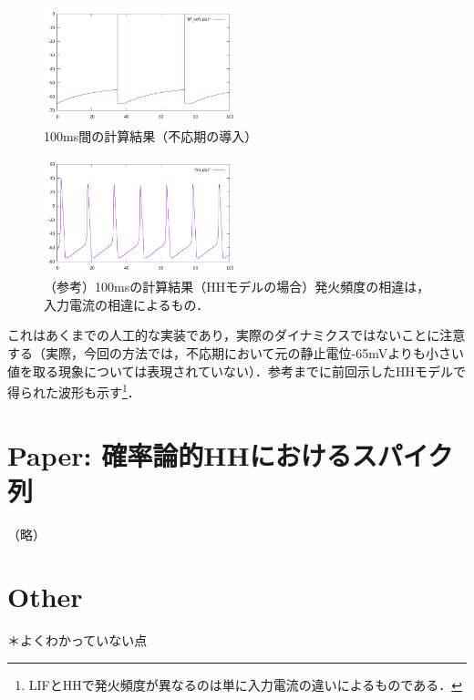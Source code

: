 \documentclass[dvipdfmx, A4j, twocolumn, 10.5pt]{jsarticle}
\begin{document}
\begin{figure}[h]
    \centering
    \includegraphics[width=0.5\textwidth]{images/lif_refr_100ms.pdf}
    \caption{100ms間の計算結果（不応期の導入）}
\end{figure}

\begin{figure}[h]
    \centering
    \includegraphics[width=0.5\textwidth]{images/0301_hh_100.pdf}
    \caption{（参考）100msの計算結果（HHモデルの場合）発火頻度の相違は，入力電流の相違によるもの．}
\end{figure}

これはあくまでの人工的な実装であり，実際のダイナミクスではないことに注意する（実際，今回の方法では，不応期において元の静止電位-65mVよりも小さい値を取る現象については表現されていない）．参考までに前回示したHHモデルで得られた波形も示す\footnote{LIFとHHで発火頻度が異なるのは単に入力電流の違いによるものである．}．

\vspace{\baselineskip}
\vspace{\baselineskip}

\section{Paper: 確率論的HHにおけるスパイク列}

（略）

\vspace{\baselineskip}
\vspace{\baselineskip}

\section*{Other}
＊よくわかっていない点 \\
\end{document}
